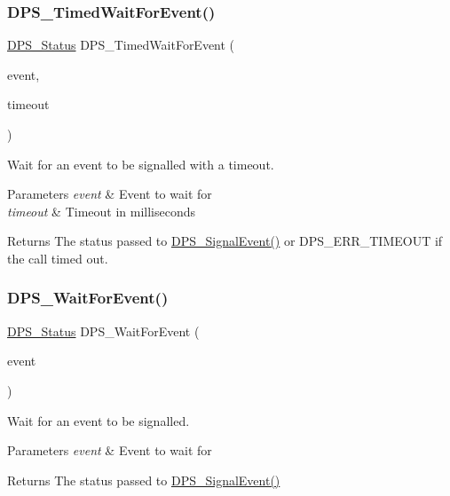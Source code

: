 \subsubsection{\texorpdfstring{D\+P\+S\+\_\+\+Timed\+Wait\+For\+Event()}{DPS\_TimedWaitForEvent()}}
{\footnotesize\ttfamily \hyperlink{group__status_ga30395a84d3cad9d4ec29848106415038}{D\+P\+S\+\_\+\+Status} D\+P\+S\+\_\+\+Timed\+Wait\+For\+Event (\begin{DoxyParamCaption}\item[{\hyperlink{group__event_ga97617da1bac0e76646713b8665dfdd85}{D\+P\+S\+\_\+\+Event} $\ast$}]{event,  }\item[{uint16\+\_\+t}]{timeout }\end{DoxyParamCaption})}



Wait for an event to be signalled with a timeout. 


\begin{DoxyParams}{Parameters}
{\em event} & Event to wait for \\
\hline
{\em timeout} & Timeout in milliseconds\\
\hline
\end{DoxyParams}
\begin{DoxyReturn}{Returns}
The status passed to \hyperlink{group__event_gad0f8a3b372f972bfaa97e29fa01b5c82}{D\+P\+S\+\_\+\+Signal\+Event()} or D\+P\+S\+\_\+\+E\+R\+R\+\_\+\+T\+I\+M\+E\+O\+UT if the call timed out. 
\end{DoxyReturn}
\mbox{\label{group__event_gab2f3f1236cd100cd271c85191df650e8}} 
\subsubsection{\texorpdfstring{D\+P\+S\+\_\+\+Wait\+For\+Event()}{DPS\_WaitForEvent()}}
{\footnotesize\ttfamily \hyperlink{group__status_ga30395a84d3cad9d4ec29848106415038}{D\+P\+S\+\_\+\+Status} D\+P\+S\+\_\+\+Wait\+For\+Event (\begin{DoxyParamCaption}\item[{\hyperlink{group__event_ga97617da1bac0e76646713b8665dfdd85}{D\+P\+S\+\_\+\+Event} $\ast$}]{event }\end{DoxyParamCaption})}



Wait for an event to be signalled. 


\begin{DoxyParams}{Parameters}
{\em event} & Event to wait for\\
\hline
\end{DoxyParams}
\begin{DoxyReturn}{Returns}
The status passed to \hyperlink{group__event_gad0f8a3b372f972bfaa97e29fa01b5c82}{D\+P\+S\+\_\+\+Signal\+Event()} 
\end{DoxyReturn}
